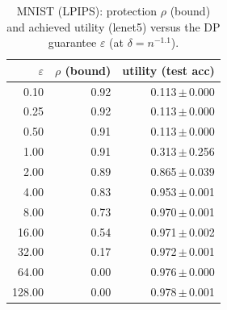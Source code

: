 \begin{table}[t]
  \centering
  \caption{MNIST (LPIPS): protection $\rho$ (bound) and achieved utility (lenet5) versus the DP guarantee $\varepsilon$ (at $\delta=n^{-1.1}$).}
  \label{tab:util_mnist_lpips}
  \begin{tabular}{r r r}
    \toprule
    $\varepsilon$ & $\rho$ (bound) & utility (test acc) \\
    \midrule
    0.10 & 0.92 & 0.113\,$\pm$\,0.000 \\
    0.25 & 0.92 & 0.113\,$\pm$\,0.000 \\
    0.50 & 0.91 & 0.113\,$\pm$\,0.000 \\
    1.00 & 0.91 & 0.313\,$\pm$\,0.256 \\
    2.00 & 0.89 & 0.865\,$\pm$\,0.039 \\
    4.00 & 0.83 & 0.953\,$\pm$\,0.001 \\
    8.00 & 0.73 & 0.970\,$\pm$\,0.001 \\
    16.00 & 0.54 & 0.971\,$\pm$\,0.002 \\
    32.00 & 0.17 & 0.972\,$\pm$\,0.001 \\
    64.00 & 0.00 & 0.976\,$\pm$\,0.000 \\
    128.00 & 0.00 & 0.978\,$\pm$\,0.001 \\
    \bottomrule
  \end{tabular}
\end{table}
